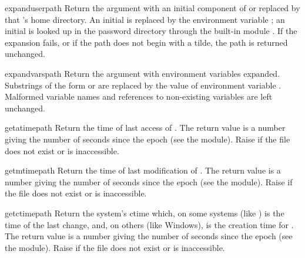\begin{funcdesc}{expanduser}{path}
Return the argument with an initial component of \samp{\~} or
 replaced by that 's home directory.  An
initial \samp{\~{}} is replaced by the environment variable
; an initial  is looked up in the
password directory through the built-in module
.  If the expansion fails, or if the
path does not begin with a tilde, the path is returned unchanged.
\end{funcdesc}

\begin{funcdesc}{expandvars}{path}
Return the argument with environment variables expanded.  Substrings
of the form  or  are
replaced by the value of environment variable .  Malformed
variable names and references to non-existing variables are left
unchanged.
\end{funcdesc}

\begin{funcdesc}{getatime}{path}
Return the time of last access of .  The return
value is a number giving the number of seconds since the epoch (see the 
 module).  Raise  if the file does
not exist or is inaccessible.
\end{funcdesc}

\begin{funcdesc}{getmtime}{path}
Return the time of last modification of .  The return
value is a number giving the number of seconds since the epoch (see the 
 module).  Raise  if the file does
not exist or is inaccessible.
\end{funcdesc}

\begin{funcdesc}{getctime}{path}
Return the system's ctime which, on some systems (like \UNIX) is the
time of the last change, and, on others (like Windows), is the
creation time for .  The return
value is a number giving the number of seconds since the epoch (see the 
 module).  Raise  if the file does
not exist or is inaccessible.
\end{funcdesc}

